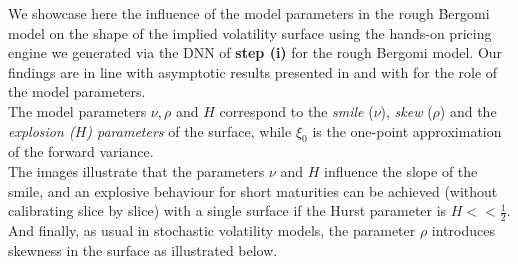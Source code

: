 \documentclass{article}
\theoremstyle{remark}
\begin{document}
We showcase here the influence of the model parameters in the rough Bergomi model on the shape of the implied volatility surface using the hands-on pricing engine we generated via the DNN of \textbf{step (i)} for the rough Bergomi model. Our findings are in line with asymptotic results presented in \cite{BFGHS} and with \cite{MP18} for the role of the model parameters.
\vspace*{0.3cm}\\
The model parameters $\nu, \rho$ and $H$ correspond to the \emph{smile }($\nu$), \emph{skew }($\rho$) and the \emph{explosion ($H$) parameters} of the surface, while $\xi_0$ is the one-point approximation of the forward variance.\\
The images illustrate that the parameters $\nu$ and $H$ influence the slope of the smile, and an explosive behaviour for short maturities can be achieved (without calibrating slice by slice) with a single surface if the Hurst parameter is $H<<\frac{1}{2}$. 
And finally, as usual in stochastic volatility models, the parameter $\rho$ introduces skewness in the surface as illustrated below.

\newpage
\end{document}
